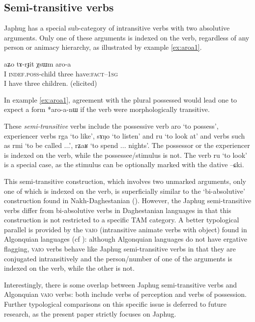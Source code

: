 \documentclass[oldfontcommands,oneside,a4paper,11pt]{article}
\newcommand{\ipa}[1]{{\phon #1}} %
\begin{document}
\subsection{Semi-transitive verbs}
  Japhug has a special sub-category of intransitive verbs with two absolutive arguments. Only one of these arguments is indexed on the verb, regardless of any person or animacy hierarchy, as illustrated by example \ref{ex:aroa1}.
  

 \begin{exe}
   \ex   \label{ex:aroa1}
 \gll 
\ipa{aʑo}  	\ipa{tɤ-rɟit}  	\ipa{χsɯm}  	\ipa{aro-a}   \\
I \textsc{indef.poss}-child three have:\textsc{fact}--\textsc{1sg} \\
 \glt   I have three children. (elicited)
   \end{exe} 

 
In example \ref{ex:aroa1}, agreement with the plural possessed would lead one to expect a form *\ipa{aro-a-nɯ} if the verb were morphologically transitive.
  

  These  \textit{semi-transitive} verbs   include the possessive verb \ipa{aro} `to possess',  experiencer verbs \ipa{rga} `to like', \ipa{sɤŋo} `to listen' and \ipa{ru} `to look at' and verbs such as \ipa{rmi} `to be called ...', \ipa{rʑaʁ} `to spend ... nights'. The possessor or the experiencer is indexed on the verb, while the possessee/stimulus is not. The verb \ipa{ru} `to look' is a special case, as the stimulus can be optionally marked with the dative \ipa{--ɕki}. 

This semi-transitive construction, which involves two unmarked arguments, only one of which is indexed on the verb, is superficially similar to the `bi-absolutive' construction found in Nakh-Daghestanian (\citealt{forker12biabsolutive}). However, the Japhug semi-transitive verbs differ from bi-absolutive verbs in Daghestanian languages in that this construction is not restricted to a specific TAM category. A better typological parallel is provided by the  \textsc{vaio} (intransitive animate verbs with object) found in Algonquian languages (cf  \citealt[242]{valentine01grammar}): although Algonquian languages do not have ergative flagging, \textsc{vaio} verbs behave like Japhug semi-transitive verbs in that they are conjugated intransitively and the person/number of one of the arguments is indexed on the verb, while the other is not.

Interestingly, there is some overlap between Japhug semi-transitive verbs and Algonquian \textsc{vaio} verbs: both include verbs of perception and verbs of possession. Further typological comparisons on this specific issue is deferred to future research, as the present paper strictly focuses on Japhug.
\end{document}
